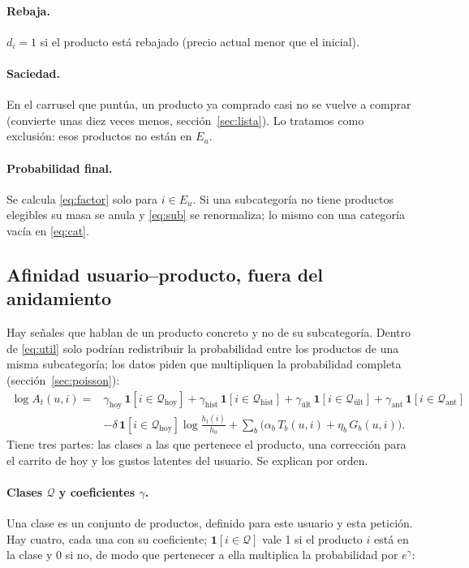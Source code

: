 \documentclass[11pt,a4paper]{article}
\begin{document}
\paragraph{Rebaja.} $d_i=1$ si el producto está rebajado (precio actual menor que el inicial).

\paragraph{Saciedad.} En el carrusel que puntúa, un producto ya comprado casi no se vuelve a comprar
(convierte unas diez veces menos, sección~\ref{sec:lista}). Lo tratamos como exclusión: esos productos
no están en $E_u$.

\paragraph{Probabilidad final.} Se calcula \eqref{eq:factor} solo para $i\in E_u$. Si una subcategoría
no tiene productos elegibles su masa se anula y \eqref{eq:sub} se renormaliza; lo mismo con una
categoría vacía en \eqref{eq:cat}.

\subsection{Afinidad usuario--producto, fuera del anidamiento}\label{sec:afinidad}

Hay señales que hablan de un producto concreto y no de su subcategoría. Dentro de \eqref{eq:util} solo
podrían redistribuir la probabilidad entre los productos de una misma subcategoría; los datos piden que
multipliquen la probabilidad completa (sección~\ref{sec:poisson}):
\begin{equation}
\begin{aligned}
\log A_t(u,i)={}&\gamma_{\text{hoy}}\,\mathbf 1[i\in\mathcal Q_{\text{hoy}}]
+\gamma_{\text{hist}}\,\mathbf 1[i\in\mathcal Q_{\text{hist}}]
+\gamma_{\text{últ}}\,\mathbf 1[i\in\mathcal Q_{\text{últ}}]
+\gamma_{\text{ant}}\,\mathbf 1[i\in\mathcal Q_{\text{ant}}]\\
&-\delta\,\mathbf 1[i\in\mathcal Q_{\text{hoy}}]\log\frac{h_t(i)}{h_0}
+\sum_{b}\big(\alpha_b\,T_b(u,i)+\eta_b\,G_b(u,i)\big).
\end{aligned}\label{eq:afinidad}
\end{equation}
Tiene tres partes: las clases a las que pertenece el producto, una corrección para el carrito de hoy y
los gustos latentes del usuario. Se explican por orden.

\paragraph{Clases $\mathcal Q$ y coeficientes $\gamma$.} Una clase es un conjunto de productos, definido
para este usuario y esta petición. Hay cuatro, cada una con su coeficiente; $\mathbf 1[i\in\mathcal Q]$
vale 1 si el producto $i$ está en la clase y 0 si no, de modo que pertenecer a ella multiplica la
probabilidad por $e^{\gamma}$:
\end{document}
